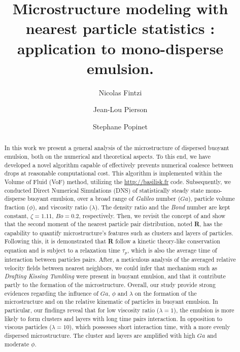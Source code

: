 \documentclass{My_preprint}
\title{
    Microstructure modeling with
    nearest particle statistics : application to mono-disperse emulsion.
    }
\author[1,2]{Nicolas Fintzi}
\author[1]{Jean-Lou Pierson}
\author[2]{Stephane Popinet}
\affil[1]{IFP Energies Nouvelles, Rond-point de l’echangeur de Solaize, 69360 Solaize}
\affil[2]{Sorbonne Universit\'e, Institut Jean le Rond d’Alembert, 4 place Jussieu, 75252 PARIS CEDEX 05, France}
\begin{document}
\maketitle

\begin{abstract}
    In this work we present a general analysis of the microstructure of dispersed buoyant emulsion, both on the numerical and theoretical aspects.
    To this end, we have developed a novel algorithm capable of effectively prevents numerical coalesce between drops at reasonable computational cost.
    This algorithm is implemented within the Volume of Fluid (VoF) method, utilizing the \href{http://basilisk.fr}{http://basilisk.fr} code. 
    Subsequently, we conducted Direct Numerical Simulations (DNS) of statistically steady state mono-disperse buoyant emulsion, over a broad range of \textit{Galileo} number ($Ga$), particle volume fraction ($\phi$), and viscosity ratio ($\lambda$). 
    The density ratio and the \textit{Bond} number are kept constant, $\zeta = 1.11$,  $Bo = 0.2$, respectively. 
    Then, we revisit the concept of \citet{zhang2023evolution} and show that the second moment of the nearest particle pair distribution, noted \textbf{R}, has the capability to quantify microstructure's features such as clusters and layers of particles.
    Following this, it is  demonstrated that \textbf{R} follow a kinetic theory-like conservation equation and is subject to a relaxation time $\tau_p$, which is also the average time of interaction between particles pairs. 
    After, a meticulous analysis of the averaged relative velocity fields between nearest neighbors, we could infer that mechanism such as \textit{Drafting Kissing Tumbling} \citep{fortes1987nonlinear} were present in buoyant emulsion, and that it contribute partly to the formation of the microstructure.
    Overall, our study provide strong evidences regarding the influence of $Ga$, $\phi$ and $\lambda$ on the formation of the microstructure and on the relative kinematic of particles in buoyant emulsion. 
    In particular, our findings reveal that for low viscosity ratio ($\lambda = 1$), the emulsion is more likely to form clusters and layers with long time pairs interaction.
    In opposition to viscous particles ($\lambda = 10$), which possesses short interaction time, with a more evenly dispersed microstructure.
    The cluster and layers are amplified with high $Ga$ and moderate $\phi$. 
\end{abstract}
\end{document}
